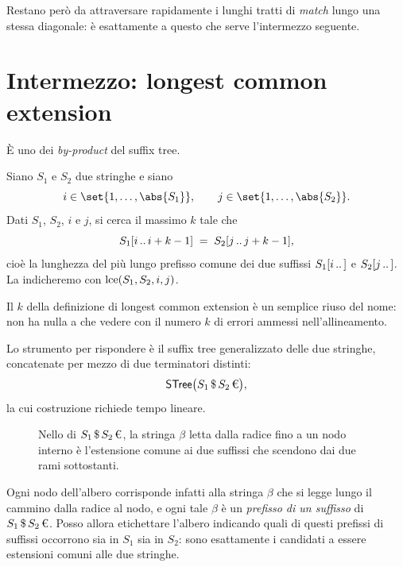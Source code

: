 Restano però da attraversare rapidamente i lunghi tratti di \emph{match} lungo
una stessa diagonale: è esattamente a questo che serve l'intermezzo seguente.

\section{Intermezzo: longest common extension}

È uno dei \emph{by-product} del suffix tree.

\begin{definizione}
\label{def:lce}
  Siano $S_1$ e $S_2$ due stringhe e siano
  \[
    i\in\set{1,\dots,\abs{S_1}}, \qquad j\in\set{1,\dots,\abs{S_2}}.
  \]
  Dati $S_1$, $S_2$, $i$ e $j$, si cerca il massimo $k$ tale che
  \[
    S_1[i\,..\,i+k-1] \;=\; S_2[j\,..\,j+k-1],
  \]
  cioè la lunghezza del più lungo prefisso comune dei due suffissi
  $S_1[i\,..\,]$ e $S_2[j\,..\,]$. La indicheremo con $\operatorname{lce}(S_1,S_2,i,j)$.
\end{definizione}

\begin{osservazione}
  Il $k$ della definizione di longest common extension è un semplice riuso del
  nome: non ha nulla a che vedere con il numero $k$ di errori ammessi
  nell'allineamento.
\end{osservazione}

Lo strumento per rispondere è il suffix tree generalizzato delle due stringhe,
concatenate per mezzo di due terminatori distinti:
\[
  \STree\bigl(S_1\,\text{\$}\,S_2\,\text{\texteuro}\bigr),
\]
la cui costruzione richiede tempo lineare.

\begin{figure}[H]
  \centering
  
  \caption{Nello \STree di $S_1\,\text{\$}\,S_2\,\text{\texteuro}$, la stringa
  $\beta$ letta dalla radice fino a un nodo interno è l'estensione comune ai due
  suffissi che scendono dai due rami sottostanti.}
  \label{fig:lv-stree-lce}
\end{figure}

Ogni nodo dell'albero corrisponde infatti alla stringa $\beta$ che si legge
lungo il cammino dalla radice al nodo, e ogni tale $\beta$ è un \emph{prefisso
di un suffisso} di $S_1\,\text{\$}\,S_2\,\text{\texteuro}$. Posso allora
etichettare l'albero indicando quali di questi prefissi di suffissi occorrono
sia in $S_1$ sia in $S_2$: sono esattamente i candidati a essere estensioni
comuni alle due stringhe.

